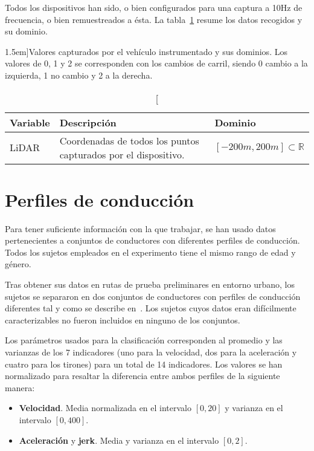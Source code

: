 Todos los dispositivos han sido, o bien configurados para una captura a 10Hz de frecuencia, o bien remuestreados a ésta. La tabla~\ref{tbl:data-obtained-from-instrumented-vehicle} resume los datos recogidos y su dominio.

\begin{table}[t]
	\caption[Resúmen de información extraída del vehículo instrumentado][1.5em]{Valores capturados por el vehículo instrumentado y sus dominios. Los valores de 0, 1 y 2 se corresponden con los cambios de carril, siendo 0 cambio a la izquierda, 1 no cambio y 2 a la derecha.}
	\label{tbl:data-obtained-from-instrumented-vehicle}
	\begin{tabular}{lll}
		\toprule
		Variable & Descripción & Dominio \\
		\midrule
		LiDAR & Coordenadas de todos los puntos capturados por el dispositivo. & $[-200m, 200m] \subset \mathbb{R}$ \\
		\bottomrule
	\end{tabular}
\end{table}

\section{Perfiles de conducción}

Para tener suficiente información con la que trabajar, se han usado datos pertenecientes a conjuntos de conductores con diferentes perfiles de conducción. Todos los sujetos empleados en el experimento tiene el mismo rango de edad y género.

Tras obtener sus datos en rutas de prueba preliminares en entorno urbano, los sujetos se separaron en dos conjuntos de conductores con perfiles de conducción diferentes tal y como se describe en~\cite{DiazAlvarez2014}. Los sujetos cuyos datos eran difícilmente caracterizables no fueron incluidos en ninguno de los conjuntos.

Los parámetros usados para la clasificación corresponden al promedio y las varianzas de los 7 indicadores (uno para la velocidad, dos para la aceleración y cuatro para los tirones) para un total de 14 indicadores. Los valores se han normalizado para resaltar la diferencia entre ambos perfiles de la siguiente manera:

\begin{itemize}
	\item \textbf{Velocidad}. Media normalizada en el intervalo $[0, 20]$ y varianza en el intervalo $[0, 400]$.
	\item \textbf{Aceleración} y \textbf{jerk}. Media y varianza en el intervalo $[0, 2]$.
\end{itemize}


